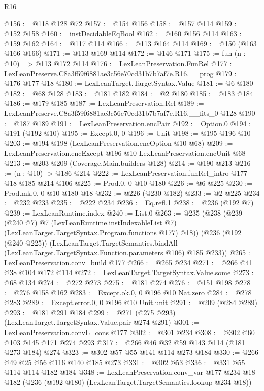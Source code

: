 \begin{lexlean}{R16}
\begin{coremodule}
@156 := @118 @128 @72
@157 := @154 @156
@158 := @157 @114
@159 := @152 @158
@160 := instDecidableEqBool
@162 := @160 @156 @114
@163 := @159 @162
@164 := @117 @114
@166 := @113 @164 @114
@169 := @150 (@163 @166 @166)
@171 := @113 @169 @114
@172 := @146 @171
@175 := fun (n : @10) => @113 @172 @114
@176 := LexLeanPreservation.FunRel
@177 := LexLeanPreserve.C8a3f59f6881ae3c56e70cd31b7b7af7e.R16.__prog
@179 := @176 @177 @18
@180 := LexLeanTarget.TargetSyntax.Value
@181 := @6 @180
@182 := @68 @128
@183 := @181 @182
@184 := @2 @180
@185 := @183 @184
@186 := @179 @185
@187 := LexLeanPreservation.Rel
@189 := LexLeanPreserve.C8a3f59f6881ae3c56e70cd31b7b7af7e.R16.__fits_0 @128
@190 := @187 @189
@191 := LexLeanPreservation.encPair
@192 := Option.{0}
@194 := @191 (@192 @10)
@195 := Except.{0, 0}
@196 := Unit
@198 := @195 @196 @10
@203 := @194 @198 (LexLeanPreservation.encOption @10 @68)
@209 := LexLeanPreservation.encExcept @196 @10 LexLeanPreservation.encUnit @68
@213 := @203 @209 (Coverage.Main.builders @128)
@214 := @190 @213
@216 := (n : @10) -> @186 @214
@222 := LexLeanPreservation.funRel_intro @177 @18 @185 @214 @106
@225 := Prod.{0, 0} @10 @180
@226 := @6 @225
@230 := Prod.mk.{0, 0} @10 @180 @18
@232 := @226 (@230 @182)
@233 := @2 @225
@234 := @232 @233
@235 := @222 @234
@236 := Eq.refl.{1}
@238 := @236 (@192 @7)
@239 := LexLeanRuntime.index
@240 := List.{0}
@263 := @235
    (@238
      (@239
        (@240 @7)
        @7
        (LexLeanRuntime.instIndexableList @7)
        (LexLeanTarget.TargetSyntax.Program.functions @177)
        @18))
    (@236
      (@192 (@240 @225))
      (LexLeanTarget.TargetSemantics.bindAll
        (LexLeanTarget.TargetSyntax.Function.parameters @106)
        @185
        @233))
@265 := LexLeanPreservation.conv_build @177
@266 := @265 @234
@271 := @266 @41 @38 @104 @172 @114
@272 := LexLeanTarget.TargetSyntax.Value.some
@273 := @68 @134
@274 := @272 @273
@275 := @181 @274
@276 := @151 @198
@278 := @276 @158 @162
@283 := Except.ok.{0, 0} @196 @10 Nat.zero
@284 := @278 @283
@289 := Except.error.{0, 0} @196 @10 Unit.unit
@291 := @209 (@284 @289)
@293 := @181 @291 @184
@299 := @271 (@275 @293) (LexLeanTarget.TargetSyntax.Value.pair @274 @291)
@301 := LexLeanPreservation.convL_cons @177
@302 := @301 @234
@308 := @302 @60 @103 @145 @171 @274 @293
@317 := @266 @46 @32 @59 @143 @114 (@181 @273 @184) @274
@323 := @302 @57 @55 @141 @114 @273 @184
@330 := @266 @49 @25 @56 @116 @140 @185 @273
@331 := @302 @53
@336 := @331 @55 @114 @114 @182 @184
@348 := LexLeanPreservation.conv_var
    @177
    @234
    @18
    @182
    (@236 (@192 @180) (LexLeanTarget.TargetSemantics.lookup @234 @18))

\end{coremodule}
\end{lexlean}
